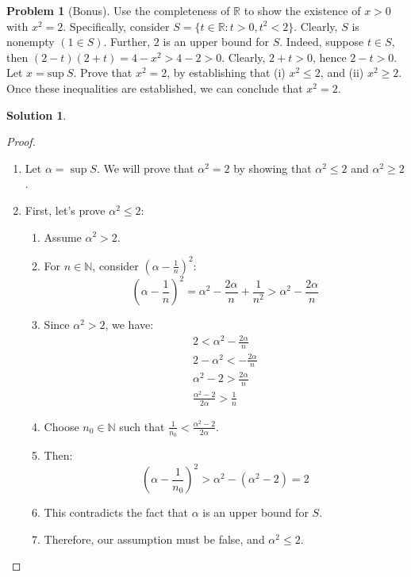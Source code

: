 \documentclass[12pt]{article}
\theoremstyle{definition} %
\newtheorem{solution}{Solution}
\newtheorem{problem}{Problem}
\theoremstyle{plain} %
\begin{document}
\begin{problem}[Bonus]
    Use the completeness of $\mathbb{R}$ to show the existence of $x>0$ with $x^2=2$. Specifically, consider $S=\{t\in \mathbb{R} : t>0, t^2<2\}$. Clearly, $S$ is nonempty $(1\in S)$. Further, $2$ is an upper bound for $S$. Indeed, suppose $t\in S$, then $(2-t)(2+t)=4-x^2>4-2>0$. Clearly, $2+t>0$, hence $2-t>0$. 
Let $x=\text{sup} \ S$. Prove that $x^2=2$, by establishing that (i) $x^2\leq 2$, and (ii) $x^2\geq 2$. Once these inequalities are established, we can conclude that $x^2=2$.

\end{problem}
\begin{solution}
    \begin{proof}
        \begin{enumerate}
            \item Let $\alpha = \sup S$. We will prove that $\alpha^2 = 2$ by showing that $\alpha^2 \leq 2$ and $\alpha^2 \geq 2$.
            \item First, let's prove $\alpha^2 \leq 2$:
            \begin{enumerate}
                \item Assume $\alpha^2 > 2$.
                \item For $n \in \mathbb{N}$, consider $(\alpha - \frac{1}{n})^2$:
                $$
                \left( \alpha-\frac{1}{n} \right)^2=\alpha^2-\frac{2\alpha}{n}+\frac{1}{n^2}>\alpha^2-\frac{2\alpha}{n}
                $$
                \item Since $\alpha^2 > 2$, we have:
                \begin{align}
                2<\alpha^2-\frac{2\alpha}{n} \\
                2-\alpha^2<-\frac{2\alpha}{n} \\
                \alpha^2-2> \frac{2\alpha}{n} \\
                \frac{\alpha^2-2}{2\alpha}> \frac{1}{n}
                \end{align}
                \item Choose $n_0 \in \mathbb{N}$ such that $\frac{1}{n_0} < \frac{\alpha^2-2}{2\alpha}$.
                \item Then:
                $$
                \left( \alpha-\frac{1}{n_0} \right)^2>\alpha^2-(\alpha^2-2)=2
                $$
                \item This contradicts the fact that $\alpha$ is an upper bound for $S$.
                \item Therefore, our assumption must be false, and $\alpha^2 \leq 2$.

\end{enumerate}
\end{enumerate}
\end{proof}
\end{solution}
\end{document}
